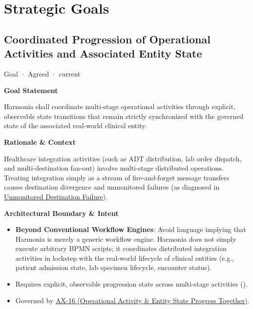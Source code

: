 \chapter{Strategic Goals}

\section{Coordinated Progression of Operational Activities and Associated Entity State}

\label{element:221eaf405d454c749112ece28ac595f1}
{\small Goal · Agreed · current}\par

\par\medskip\textbf{Goal Statement}\par


Harmonia shall coordinate multi-stage operational activities through explicit, observable state transitions that remain strictly synchronized with the governed state of the associated real-world clinical entity.



\par\medskip\textbf{Rationale \& Context}\par


Healthcare integration activities (such as ADT distribution, lab order dispatch, and multi-destination fan-out) involve multi-stage distributed operations. Treating integration simply as a stream of fire-and-forget message transfers causes destination divergence and unmonitored failures (as diagnosed in \href{\detokenize{../../../../../docs/markdown/01-motivation/drivers-assessments/assessments.md}}{Unmonitored Destination Failure}).



\par\medskip\textbf{Architectural Boundary \& Intent}\par


\begin{itemize}


\item \textbf{Beyond Conventional Workflow Engines}: Avoid language implying that Harmonia is merely a generic workflow engine. Harmonia does not simply execute arbitrary BPMN scripts; it coordinates distributed integration activities in lockstep with the real-world lifecycle of clinical entities (e.g., patient admission state, lab specimen lifecycle, encounter status).

\item Requires explicit, observable progression state across multi-stage activities (\href{\detokenize{../../../../../docs/markdown/01-motivation/requirements-constraints/foundational-requirements.md}}{\texttt{}}).

\item Governed by \hyperref[element:de7e90f46127455a9ec9ad3b9b48ba54]{AX-16 (Operational Activity \& Entity State Progress Together)}.

\end{itemize}

